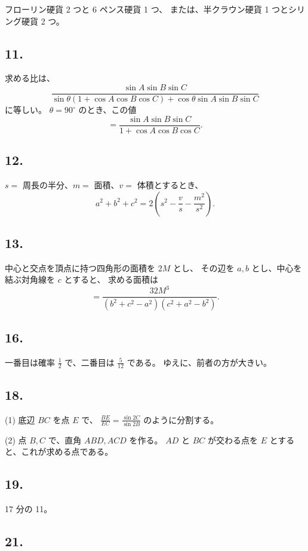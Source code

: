 フローリン硬貨 2 つと 6 ペンス硬貨 1 つ、
または、半クラウン硬貨 1 つとシリング硬貨 2 つ。


\subsection*{11.}

求める比は、
\[
\frac{\sin A \sin B \sin C}{\sin \theta (1 + \cos A \cos B \cos C)
 + \cos \theta \sin A \sin B \sin C}
\]
に等しい。
$\theta = 90^\circ$ のとき、この値
\[
= \frac{\sin A \sin B \sin C}{1 + \cos A \cos B \cos C}.
\]

\subsection*{12.}

$s =$ 周長の半分、$m =$ 面積、$v =$ 体積とするとき、
\[
a^2 + b^2 + c^2 = 2 \left( s^2 - \frac{v}{s} - \frac{m^2}{s^2} \right).
\]

\subsection*{13.}

中心と交点を頂点に持つ四角形の面積を $2M$ とし、
その辺を $a, b$ とし、中心を結ぶ対角線を $c$ とすると、
求める面積は
\[
 = \frac{32 M^3}{(b^2 + c^2 - a^2)(c^2 + a^2 - b^2)}.
\]

\subsection*{16.}

一番目は確率 $\frac{1}{2}$ で、二番目は $\frac{5}{12}$ である。
ゆえに、前者の方が大きい。


\subsection*{18.}

(1) 底辺 $BC$ を点 $E$ で、
$\frac{BE}{EC} = \frac{\sin 2C}{\sin 2B}$
のように分割する。

(2)
点 $B, C$ で、直角 $ABD, ACD$ を作る。
$AD$ と $BC$ が交わる点を $E$ とすると、これが求める点である。


\subsection*{19.}

17 分の 11。


\subsection*{21.}

